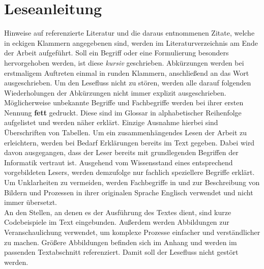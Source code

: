 \section*{Leseanleitung}
Hinweise auf referenzierte Literatur und die daraus entnommenen Zitate, welche in eckigen Klammern angegebenen sind, werden im Literaturverzeichnis am Ende der Arbeit aufgeführt. Soll ein Begriff oder eine Formulierung besonders hervorgehoben werden, ist diese \textit{kursiv} geschrieben.
Abkürzungen werden bei erstmaligem Auftreten einmal in runden Klammern, anschließend an das Wort ausgeschrieben. Um den Lesefluss nicht zu stören, werden alle darauf folgenden Wiederholungen der Abkürzungen nicht immer explizit ausgeschrieben.
\\
Möglicherweise unbekannte Begriffe und Fachbegriffe werden bei ihrer ersten
Nennung \textbf{fett} gedruckt. Diese sind im Glossar in alphabetischer Reihenfolge aufgelistet und werden näher erklärt. Einzige Ausnahme hierbei sind Überschriften von Tabellen. Um ein zusammenhängendes Lesen der Arbeit zu erleichtern, werden bei Bedarf Erklärungen bereits im Text gegeben. Dabei wird davon ausgegangen, dass der Leser bereits mit grundlegenden Begriffen der Informatik vertraut ist. Ausgehend vom Wissensstand eines entsprechend vorgebildeten Lesers, werden demzufolge nur fachlich speziellere Begriffe erklärt.
\\
Um Unklarheiten zu vermeiden, werden Fachbegriffe in und zur Beschreibung von Bildern und Prozessen in ihrer originalen Sprache Englisch verwendet und nicht immer übersetzt.
\\
An den Stellen, an denen es der Ausführung des Textes dient, sind kurze Codebeispiele im Text eingebunden. Außerdem werden Abbildungen zur Veranschaulichung verwendet, um komplexe Prozesse einfacher und verständlicher zu machen. Größere Abbildungen befinden sich im Anhang und werden im passenden Textabschnitt referenziert. Damit soll der Lesefluss nicht gestört werden.